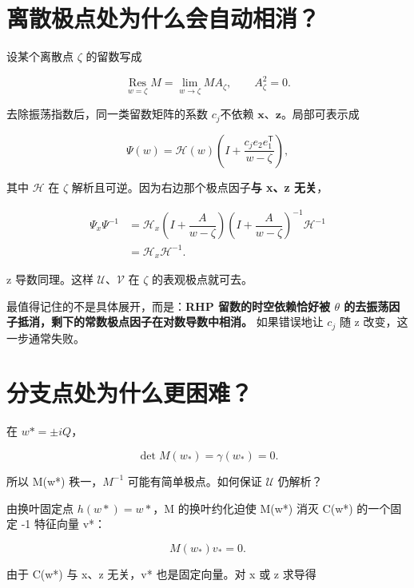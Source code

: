 \section{离散极点处为什么会自动相消？}

设某个离散点 $\zeta{}$ 的留数写成\par

\[
\operatorname*{Res}_{w=\zeta}M
=\lim\limits_{w\to\zeta}M A_\zeta,
\qquad A_\zeta^2=0.
\]

去除振荡指数后，同一类留数矩阵的系数 $c_j \textbf{不依赖 x、z}$。局部可表示成\par

\[
\Psi(w)=\mathcal H(w)\left(I+\dfrac{c_j e_2e_1^{\mathsf T}}{w-\zeta}\right),
\]

其中 $\mathcal H$ 在 $\zeta{}$ 解析且可逆。因为右边那个极点因子\textbf{与 x、z 无关}，\par

\[
\begin{aligned}
\Psi_x\Psi^{-1}
&=\mathcal H_x
\left(I+\dfrac{A}{w-\zeta}\right)
\left(I+\dfrac{A}{w-\zeta}\right)^{-1}
\mathcal H^{-1}\\
&=\mathcal H_x\mathcal H^{-1}.
\end{aligned}
\]

z 导数同理。这样 $\mathcal U$、$\mathcal V$ 在 $\zeta{}$ 的表观极点就可去。\par

最值得记住的不是具体展开，而是：\textbf{RHP 留数的时空依赖恰好被 \ensuremath{\theta} 的去振荡因子抵消，剩下的常数极点因子在对数导数中相消。} 如果错误地让 $c_j$ 随 z 改变，这一步通常失败。\par

\section{分支点处为什么更困难？}

在 $w*=\pm{}iQ$，\par

\[
\det M(w_*)=\gamma(w_*)=0.
\]

所以 M(w*) 秩一，$M^{-1}$ 可能有简单极点。如何保证 $\mathcal U$ 仍解析？\par

由换叶固定点 $h(w*)=w*$，M 的换叶约化迫使 M(w*) 消灭 C(w*) 的一个固定 -1 特征向量 v*：\par

\[
M(w_*)v_*=0.
\]

由于 C(w*) 与 x、z 无关，v* 也是固定向量。对 x 或 z 求导得\par

